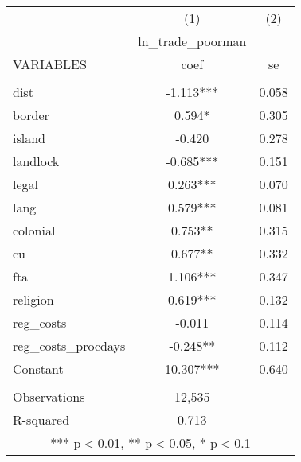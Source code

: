 \documentclass[]{article}
\begin{document}
\begin{tabular}{lcc} \hline
 & (1) & (2) \\
 & ln\_trade\_poorman &  \\
VARIABLES & coef & se \\ \hline
 &  &  \\
dist & -1.113*** & 0.058 \\
border & 0.594* & 0.305 \\
island & -0.420 & 0.278 \\
landlock & -0.685*** & 0.151 \\
legal & 0.263*** & 0.070 \\
lang & 0.579*** & 0.081 \\
colonial & 0.753** & 0.315 \\
cu & 0.677** & 0.332 \\
fta & 1.106*** & 0.347 \\
religion & 0.619*** & 0.132 \\
reg\_costs & -0.011 & 0.114 \\
reg\_costs\_procdays & -0.248** & 0.112 \\
Constant & 10.307*** & 0.640 \\
 &  &  \\
Observations & 12,535 &  \\
 R-squared & 0.713 &  \\ \hline
\multicolumn{3}{c}{ *** p$<$0.01, ** p$<$0.05, * p$<$0.1} \\
\end{tabular}
\end{document}
